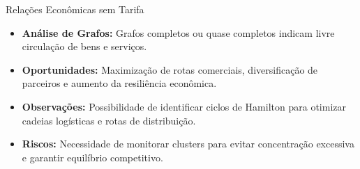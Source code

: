 \begin{frame}{Relações Econômicas sem Tarifa}
  \begin{itemize}
    \item \textbf{Análise de Grafos:} Grafos completos ou quase completos indicam livre circulação de bens e serviços.
    \item \textbf{Oportunidades:} Maximização de rotas comerciais, diversificação de parceiros e aumento da resiliência econômica.
    \item \textbf{Observações:} Possibilidade de identificar ciclos de Hamilton para otimizar cadeias logísticas e rotas de distribuição.
    \item \textbf{Riscos:} Necessidade de monitorar clusters para evitar concentração excessiva e garantir equilíbrio competitivo.
  \end{itemize}
\end{frame}
